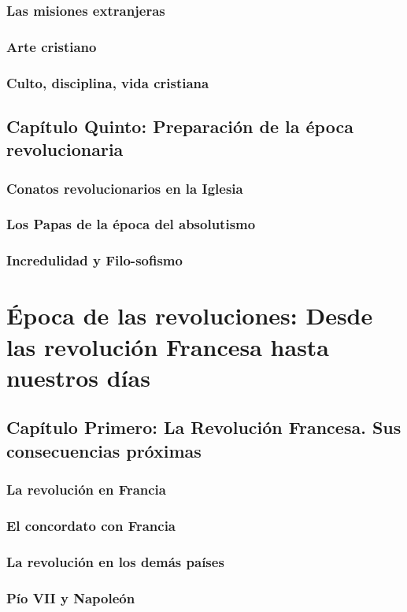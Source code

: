 \raggedbottom{} \documentclass[12pt, a4paper, openany]{book} %
\begin{document}
\section{Las misiones extranjeras}
\section{Arte cristiano}
\section{Culto, disciplina, vida cristiana}
\chapter{Capítulo Quinto: Preparación de la época revolucionaria}
\section{Conatos revolucionarios en la Iglesia}
\section{Los Papas de la época del absolutismo}
\section{Incredulidad y Filo-sofismo}
\part{Época de las revoluciones: Desde las revolución Francesa hasta nuestros días}
\chapter{Capítulo Primero: La Revolución Francesa. Sus consecuencias próximas}
\section{La revolución en Francia}
\section{El concordato con Francia}
\section{La revolución en los demás países}
\section{Pío VII y Napoleón}
\end{document}
